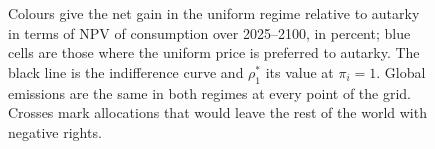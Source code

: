 \documentclass[12pt,english]{article}
\theoremstyle{remark}
\begin{document}
\begin{figure}[p]
\begin{minipage}{\textwidth}
  Colours give the net gain in the uniform regime relative to autarky in terms of NPV of consumption over 2025--2100, in percent; %
  blue cells are those where the uniform price is preferred to autarky. The black line is the indifference curve and $\rho^*_1$ its value at $\pi_i=1$. Global emissions are the same in both regimes at every point of the grid. Crosses mark allocations that would leave the rest of the world with negative rights. %
  \end{minipage}
\end{figure}
\end{document}
